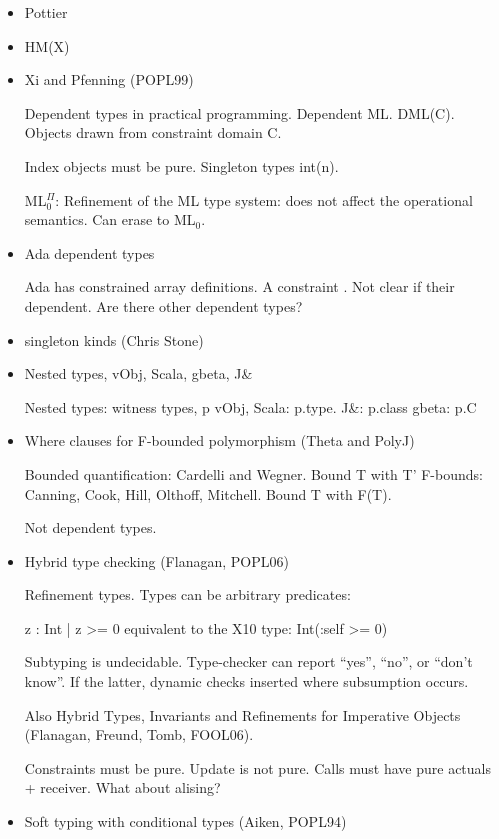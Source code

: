 \documentclass[nocopyrightspace,preprint,9pt]{sigplanconf}
\begin{document}
\begin{itemize}
\item Pottier
\item HM(X)
\item Xi and Pfenning (POPL99)

Dependent types in practical programming.
Dependent ML.  DML(C). Objects drawn from constraint domain C.

Index objects must be pure.
Singleton types int(n).

ML$^{\Pi}_0$:
Refinement of the ML type system: does not affect the
operational semantics.  Can erase to ML$_0$.



\item Ada dependent types

Ada has constrained array definitions.  A constraint
\cite{ada-ref-man}.  Not clear if their dependent.  Are there other dependent
types?

\item singleton kinds (Chris Stone)

\item Nested types, vObj, Scala, gbeta, J\&

Nested types: witness types, p
vObj, Scala: p.type.
J\&: p.class
gbeta: p.C

\item Where clauses for F-bounded polymorphism (Theta and PolyJ)

Bounded quantification: Cardelli and Wegner.  Bound T with T'
F-bounds: Canning, Cook, Hill, Olthoff, Mitchell.  Bound T with F(T).

Not dependent types.

\item Hybrid type checking (Flanagan, POPL06)


Refinement types.  Types can be arbitrary predicates:

        { z : Int | z >= 0 }
        equivalent to the X10 type:
        Int(:self >= 0)

Subtyping is undecidable.  Type-checker can report ``yes'',
``no'',
or ``don't know''.  If the latter, dynamic checks inserted where
subsumption occurs.

Also Hybrid Types, Invariants and Refinements for Imperative
Objects (Flanagan, Freund, Tomb, FOOL06).

    Constraints must be pure.  Update is not pure.
    Calls must have pure actuals + receiver.
    What about alising?


\item Soft typing with conditional types (Aiken, POPL94)


\end{itemize}
\end{document}
